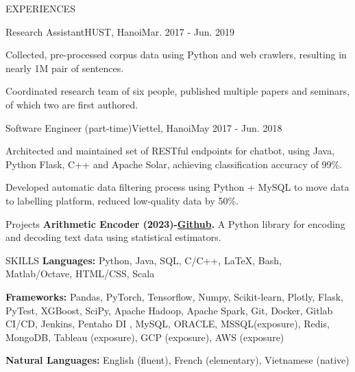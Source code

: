 \documentclass{resume} %
\begin{document}
\begin{rSection}{EXPERIENCES}
\begin{rWork}{Research Assistant}{HUST, Hanoi}{Mar. 2017 - Jun. 2019}
    \item Collected, pre-processed corpus data using Python and web crawlers, resulting in nearly 1M pair of sentences.
    \item Coordinated research team of six people, published multiple papers and seminars, of which two are first authored.
  \end{rWork}
  \begin{rWork}{Software Engineer (part-time)}{Viettel, Hanoi}{May 2017 - Jun. 2018}
    \item Architected and maintained set of RESTful endpoints for chatbot, using Java, Python Flask, C++ and Apache Solar, achieving classification accuracy of 99\%.
    \item Developed automatic data filtering process using Python + MySQL to move data to labelling platform, reduced low-quality data by 50\%.
  \end{rWork}
  \end{rSection}
\begin{rSection}{Projects}
\textbf{Arithmetic Encoder (2023)-\href{https://github.com/HongHaiPV/ArithmeticEncoder}{Github}.} A Python library for encoding and decoding text data using statistical estimators.
\end{rSection}
\begin{rSection}{SKILLS}
\textbf{Languages:} Python, Java, SQL, C/C++, \LaTeX, Bash, Matlab/Octave, HTML/CSS, Scala

\textbf{Frameworks:} Pandas, PyTorch, Tensorflow, Numpy, Scikit-learn, Plotly, Flask, PyTest, XGBoost, SciPy, Apache Hadoop, Apache Spark, Git, Docker, Gitlab CI/CD, Jenkins, Pentaho DI , MySQL, ORACLE, MSSQL(exposure), Redis, MongoDB, Tableau (exposure), GCP (exposure), AWS (exposure)

\textbf{Natural Languages:} English (fluent), French (elementary), Vietnamese (native)

\end{rSection}
\end{document}
